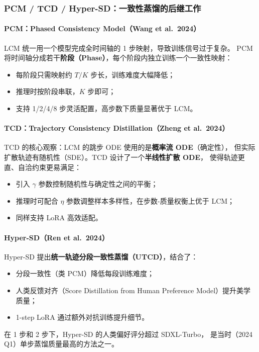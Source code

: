 \subsubsection{PCM / TCD / Hyper-SD：一致性蒸馏的后继工作}

\paragraph{PCM：Phased Consistency Model（Wang et al.\ 2024）}

\begin{conceptbox}
LCM 统一用一个模型完成全时间轴的 1 步映射，导致训练信号过于复杂。
PCM 将时间轴分成若干\textbf{阶段（Phase）}，每个阶段内独立训练一个一致性映射：
\begin{itemize}
  \item 每阶段只需映射约 $T/K$ 步长，训练难度大幅降低；
  \item 推理时按阶段串联，$K$ 步即可；
  \item 支持 1/2/4/8 步灵活配置，高步数下质量显著优于 LCM。
\end{itemize}
\end{conceptbox}

\paragraph{TCD：Trajectory Consistency Distillation（Zheng et al.\ 2024）}

\begin{conceptbox}
TCD 的核心观察：LCM 的跳步 ODE 使用的是\textbf{概率流 ODE}（确定性），
但实际扩散轨迹有随机性（SDE）。TCD 设计了一个\textbf{半线性扩散 ODE}，
使得轨迹更直、自洽约束更易满足：
\begin{itemize}
  \item 引入 $\gamma$ 参数控制随机性与确定性之间的平衡；
  \item 推理时可配合 $\eta$ 参数调整样本多样性，在步数-质量权衡上优于 LCM；
  \item 同样支持 LoRA 高效适配。
\end{itemize}
\end{conceptbox}

\paragraph{Hyper-SD（Ren et al.\ 2024）}

\begin{conceptbox}
Hyper-SD 提出\textbf{统一轨迹分段一致性蒸馏（UTCD）}，结合了：
\begin{itemize}
  \item 分段一致性（类 PCM）降低每段训练难度；
  \item 人类反馈对齐（Score Distillation from Human Preference Model）提升美学质量；
  \item 1-step LoRA 通过额外对抗训练提升细节。
\end{itemize}
在 1 步和 2 步下，Hyper-SD 的人类偏好评分超过 SDXL-Turbo，
是当时（2024 Q1）单步蒸馏质量最高的方法之一。
\end{conceptbox}

